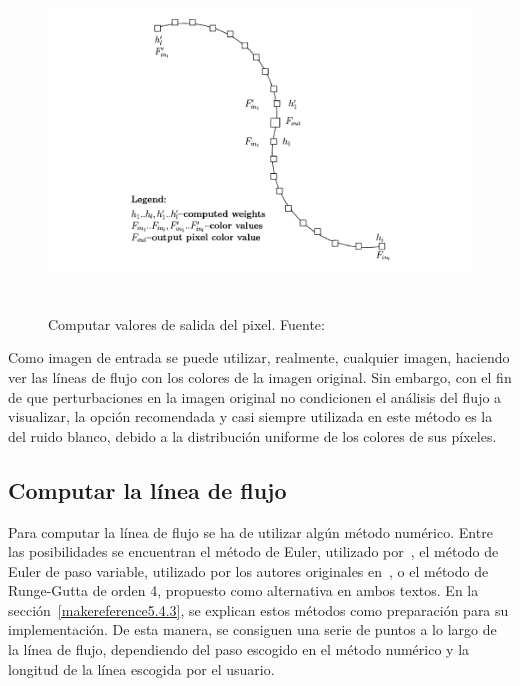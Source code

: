 \begin{figure}
		\centering
		\includegraphics[height=9cm]{figures/licoutputpixel.png}
		\caption[Computar valores de salida del pixel.]{Computar valores de
		salida del pixel. Fuente:~\cite{licthesis}}	
		\label{fig:licoutputpixel}
\end{figure}

Como imagen de entrada se puede utilizar, realmente, cualquier imagen,
haciendo ver las líneas de flujo con los colores de la imagen original. Sin
embargo, con el fin de que perturbaciones en la imagen original no condicionen
el análisis del flujo a visualizar, la opción recomendada y casi siempre
utilizada en este método es la del ruido blanco, debido a la distribución
uniforme de los colores de sus píxeles. 

\subsection{Computar la línea de flujo}
\label{ref:streamline}

Para computar la línea de flujo se ha de utilizar algún método numérico. Entre
las posibilidades se encuentran el método de Euler, utilizado
por~\citet{licthesis}, el método de Euler de paso variable, utilizado por los
autores originales en~\citet{osti_10185520}, o el método de Runge-Gutta de orden
4, propuesto como alternativa en ambos textos. En la
sección~\ref{makereference5.4.3}, se explican estos métodos como preparación
para su implementación. De esta manera, se consiguen una serie de puntos a lo
largo de la línea de flujo, dependiendo del paso escogido en el método numérico
y la longitud de la línea escogida por el usuario.

